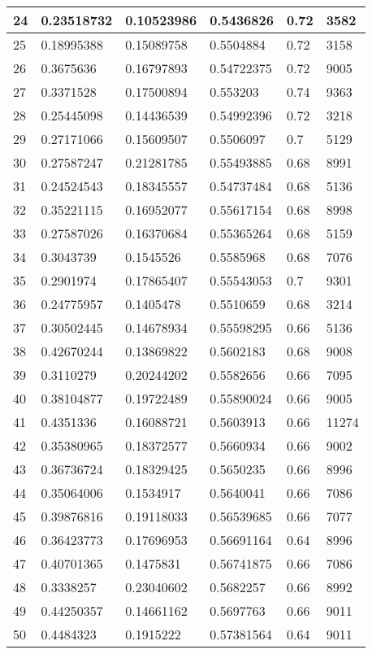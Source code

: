 \begin{longtable}{|l|l|l|l|l|l|}
24 & 0.23518732 & 0.10523986 & 0.5436826 & 0.72 & 3582 \\ \hline 
25 & 0.18995388 & 0.15089758 & 0.5504884 & 0.72 & 3158 \\ \hline 
26 & 0.3675636 & 0.16797893 & 0.54722375 & 0.72 & 9005 \\ \hline 
27 & 0.3371528 & 0.17500894 & 0.553203 & 0.74 & 9363 \\ \hline 
28 & 0.25445098 & 0.14436539 & 0.54992396 & 0.72 & 3218 \\ \hline 
29 & 0.27171066 & 0.15609507 & 0.5506097 & 0.7 & 5129 \\ \hline 
30 & 0.27587247 & 0.21281785 & 0.55493885 & 0.68 & 8991 \\ \hline 
31 & 0.24524543 & 0.18345557 & 0.54737484 & 0.68 & 5136 \\ \hline 
32 & 0.35221115 & 0.16952077 & 0.55617154 & 0.68 & 8998 \\ \hline 
33 & 0.27587026 & 0.16370684 & 0.55365264 & 0.68 & 5159 \\ \hline 
34 & 0.3043739 & 0.1545526 & 0.5585968 & 0.68 & 7076 \\ \hline 
35 & 0.2901974 & 0.17865407 & 0.55543053 & 0.7 & 9301 \\ \hline 
36 & 0.24775957 & 0.1405478 & 0.5510659 & 0.68 & 3214 \\ \hline 
37 & 0.30502445 & 0.14678934 & 0.55598295 & 0.66 & 5136 \\ \hline 
38 & 0.42670244 & 0.13869822 & 0.5602183 & 0.68 & 9008 \\ \hline 
39 & 0.3110279 & 0.20244202 & 0.5582656 & 0.66 & 7095 \\ \hline 
40 & 0.38104877 & 0.19722489 & 0.55890024 & 0.66 & 9005 \\ \hline 
41 & 0.4351336 & 0.16088721 & 0.5603913 & 0.66 & 11274 \\ \hline 
42 & 0.35380965 & 0.18372577 & 0.5660934 & 0.66 & 9002 \\ \hline 
43 & 0.36736724 & 0.18329425 & 0.5650235 & 0.66 & 8996 \\ \hline 
44 & 0.35064006 & 0.1534917 & 0.5640041 & 0.66 & 7086 \\ \hline 
45 & 0.39876816 & 0.19118033 & 0.56539685 & 0.66 & 7077 \\ \hline 
46 & 0.36423773 & 0.17696953 & 0.56691164 & 0.64 & 8996 \\ \hline 
47 & 0.40701365 & 0.1475831 & 0.56741875 & 0.66 & 7086 \\ \hline 
48 & 0.3338257 & 0.23040602 & 0.5682257 & 0.66 & 8992 \\ \hline 
49 & 0.44250357 & 0.14661162 & 0.5697763 & 0.66 & 9011 \\ \hline 
50 & 0.4484323 & 0.1915222 & 0.57381564 & 0.64 & 9011 \\ \hline 
\end{longtable}